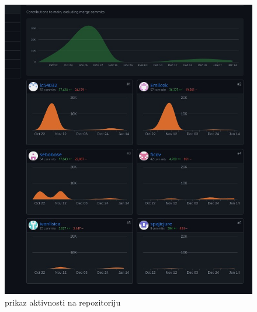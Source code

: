 		\begin{figure}[H]
			\centering
			\includegraphics[width=\textwidth]{slike/dijagram.jpeg}
			\caption{prikaz aktivnosti na repozitoriju}
			\label{fig:dijagram_baze}
		\end{figure}
		
	